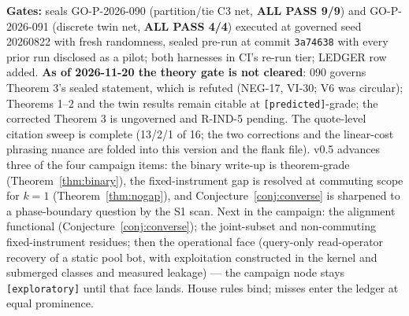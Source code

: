 \documentclass[11pt]{article}
\theoremstyle{definition}
\begin{document}
\textbf{Gates:} seals GO-P-2026-090 (partition/tie C3 net,
\textbf{ALL PASS 9/9}) and GO-P-2026-091 (discrete twin net,
\textbf{ALL PASS 4/4}) executed at governed seed 20260822 with fresh
randomness, sealed pre-run at commit \texttt{3a74638} with every prior
run disclosed as a pilot; both harnesses in CI's re-run tier; LEDGER
row added. \textbf{As of 2026-11-20 the theory gate is not cleared}:
090 governs Theorem 3's sealed statement, which is refuted (NEG-17,
VI-30; V6 was circular); Theorems 1--2 and the twin results remain
citable at \texttt{[predicted]}-grade; the corrected Theorem 3 is
ungoverned and R-IND-5 pending. The quote-level citation sweep is
complete (13/2/1 of 16; the two corrections and the linear-cost
phrasing nuance are folded into this version and the flank file).
v0.5 advances three of the four campaign items: the binary
write-up is theorem-grade (Theorem~\ref{thm:binary}), the
fixed-instrument gap is resolved at commuting scope for $k=1$
(Theorem~\ref{thm:nogap}), and Conjecture~\ref{conj:converse} is
sharpened to a phase-boundary question by the S1 scan. Next in the
campaign: the alignment functional (Conjecture~\ref{conj:converse});
the joint-subset and non-commuting fixed-instrument residues; then
the operational face (query-only read-operator recovery of a static
pool bot, with exploitation constructed in the kernel and submerged
classes and measured leakage) --- the campaign node stays
\texttt{[exploratory]} until that face lands. House rules bind;
misses enter the ledger at equal prominence.
\end{document}
